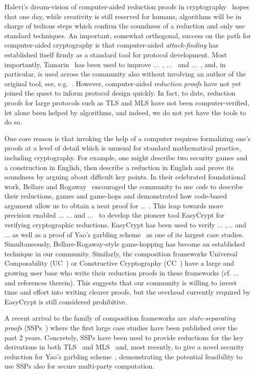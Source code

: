 Halevi's dream-vision of computer-aided reduction proofs in cryptography~\cite{Halevi} hopes that one day, while creativity is still reserved for humans, algorithms will be in charge of tedious steps which confirm the soundness of a reduction and only use standard techniques. An important, somewhat orthogonal, success on the path for computer-aided cryptography is that computer-aided \emph{attack-finding} has established itself firmly as a standard tool for protocol development. Most importantly, Tamarin~\cite{X} has been used to improve ...~\cite{X}, ...~\cite{X} and ...~\cite{X}, and, in particular, is used across the community also without involving an author of the original tool, see, e.g.~\cite{X}. However, computer-aided \emph{reduction proofs} have not yet joined the quest to inform protocol design quickly. In fact, to date, reduction proofs for large protocols such as TLS and MLS have not been computer-verified, let alone been helped by algorithms, and indeed, we do not yet have the tools to do so.

One core reason is that invoking the help of a computer requires formalizing one's proofs at a level of detail which is unusual for standard mathematical practice, including cryptography. For example, one might describe two security games and a construction in English, then describe a reduction in English and prove its soundness by arguing about difficult key points. In their celebrated foundational work, Bellare and Rogaway~\cite{X} encouraged the community to use \emph{code} to describe their reductions, games and game-hops and demonstrated how code-based argument allow us to obtain a neat proof for ... . This leap towards more precision enabled ... ... and ...~\cite{X} to develop the pioneer tool EasyCrypt for verifying cryptographic reductions. EasyCrypt has been used to verify ... ,... and ... as well as a proof of Yao's garbling scheme~\cite{X} as one of its largest case studies. Simultaneously, Bellare-Rogaway-style game-hopping has become an established technique in our community. Similarly, the composition frameworks Universal Composability (UC~\cite{X}) or Constructive Cryptography (CC~\cite{X}) have a large and growing user base who write their reduction proofs in these frameworks (cf. ... and references therein). This suggests that our community is willing to invest time and effort into writing clearer proofs, but the overhead currently required by EasyCrypt is still considered prohibitive. 

A recent arrival to the family of composition frameworks are \emph{state-separating proofs} (SSPs~\cite{X}) where the first large case studies have been published over the past 2 years. Concretely, SSPs have been used to provide reductions for the key derivations in both TLS~\cite{X} and MLS~\cite{X} and, most recently, to give a novel security reduction for Yao's garbling scheme~\cite{X}, demonstrating the potential feasibility to use SSPs also for secure multi-party computation.

